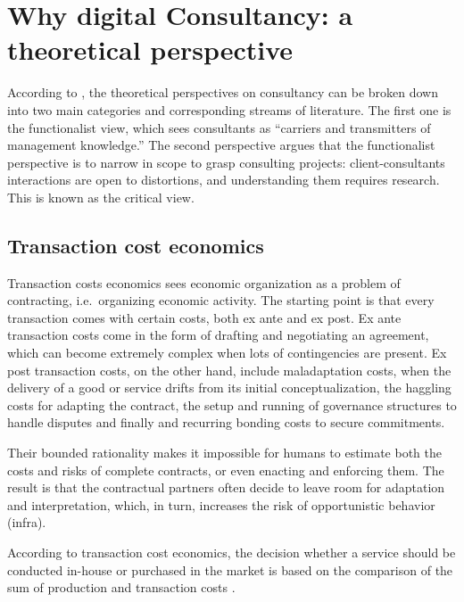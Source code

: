 \documentclass[12pt]{article}
\begin{document}
\hypertarget{why-digital-consultancy-a-theoretical-perspective}{%
\section{Why digital Consultancy: a theoretical
perspective}\label{why-digital-consultancy-a-theoretical-perspective}}

According to \citet[3-6]{armbruster2006}, the theoretical perspectives
on consultancy can be broken down into two main categories and
corresponding streams of literature. The first one is the functionalist
view, which sees consultants as ``carriers and transmitters of
management knowledge.'' The second perspective argues that the
functionalist perspective is to narrow in scope to grasp consulting
projects: client-consultants interactions are open to distortions, and
understanding them requires research. This is known as the critical
view.

\hypertarget{transaction-cost-economics}{%
\subsection{Transaction cost
economics}\label{transaction-cost-economics}}

Transaction costs economics sees economic organization as a problem of
contracting, i.e.~organizing economic activity. The starting point is
that every transaction comes with certain costs, both ex ante and ex
post. Ex ante transaction costs come in the form of drafting and
negotiating an agreement, which can become extremely complex when lots
of contingencies are present. Ex post transaction costs, on the other
hand, include maladaptation costs, when the delivery of a good or
service drifts from its initial conceptualization, the haggling costs
for adapting the contract, the setup and running of governance
structures to handle disputes and finally and recurring bonding costs to
secure commitments.

Their bounded rationality makes it impossible for humans to estimate
both the costs and risks of complete contracts, or even enacting and
enforcing them. \citep[ 53]{aubert1996} The result is that the
contractual partners often decide to leave room for adaptation and
interpretation, which, in turn, increases the risk of opportunistic
behavior (infra).

According to transaction cost economics, the decision whether a service
should be conducted in-house or purchased in the market is based on the
comparison of the sum of production and transaction costs \citep[
12]{armbruster2006}.
\end{document}

